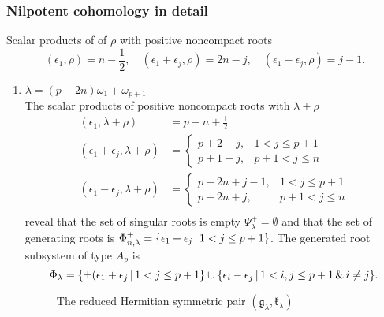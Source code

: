 \subsubsection{Nilpotent cohomology in detail}

Scalar products of of $\rho$ with positive noncompact roots
\begin{equation}\label{eq:Bn_rho_scalar_posroots}
  (\epsilon_1, \rho) = n - \frac{1}{2}, \quad (\epsilon_1 + \epsilon_j, \rho)  =  2n-j, \quad (\epsilon_1 - \epsilon_j, \rho)  =  j - 1.
\end{equation}

\begin{enumerate}
 \item $\lambda = (p-2n) \omega_1 + \omega_{p+1}$\\
      The scalar products of positive noncompact roots with $\lambda+\rho$
      \begin{align*}
	(\epsilon_1, \lambda+\rho) &= p-n+\frac{1}{2} \\
	(\epsilon_1+\epsilon_j,\lambda+\rho) &= \begin{cases}
						p+2-j, &  1<j\leq p+1\\
						p+1-j, &   p+1 <j \leq n 
	                                       \end{cases}\\
	(\epsilon_1-\epsilon_j,\lambda+\rho) &= \begin{cases}
						p-2n+j-1, &  1<j\leq p+1\\
						p-2n+j, &   p+1 <j \leq n
	                                       \end{cases}\\
      \end{align*}
      reveal that the set of singular roots is empty $\Psi^+_\lambda = \emptyset$ and that the set of generating roots is $\Phi^+_{n,\lambda} = \{\epsilon_1 + \epsilon_j \,|\, 1<j\leq p+1 \}$. The generated root subsystem of type $A_p$ is
      \[
	\Phi_\lambda = \{ \pm(\epsilon_1 + \epsilon_j \,|\, 1<j\leq p+1 \} \cup \{ \epsilon_i - \epsilon_j \,|\, 1 < i,j \leq p+1 \,\&\, i\neq j \}.
      \]


\begin{figure}[H]
\centering
{}  
  \caption{The reduced Hermitian symmetric pair $(\mathfrak{g}_\lambda, \mathfrak{k}_\lambda)$}
\end{figure}
  

\end{enumerate}
